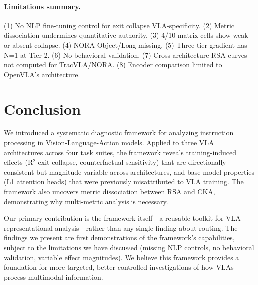 \documentclass[letterpaper]{article}
\begin{document}
\paragraph{Limitations summary.}
(1) No NLP fine-tuning control for exit collapse VLA-specificity.
(2) Metric dissociation undermines quantitative authority.
(3) 4/10 matrix cells show weak or absent collapse.
(4) NORA Object/Long missing.
(5) Three-tier gradient has N=1 at Tier-2.
(6) No behavioral validation.
(7) Cross-architecture RSA curves not computed for TracVLA/NORA.
(8) Encoder comparison limited to OpenVLA's architecture.

\section{Conclusion}

We introduced a systematic diagnostic framework for analyzing instruction processing in Vision-Language-Action models.
Applied to three VLA architectures across four task suites, the framework reveals training-induced effects (R$^2$ exit collapse, counterfactual sensitivity) that are directionally consistent but magnitude-variable across architectures, and base-model properties (L1 attention heads) that were previously misattributed to VLA training.
The framework also uncovers metric dissociation between RSA and CKA, demonstrating why multi-metric analysis is necessary.

Our primary contribution is the framework itself---a reusable toolkit for VLA representational analysis---rather than any single finding about routing.
The findings we present are first demonstrations of the framework's capabilities, subject to the limitations we have discussed (missing NLP controls, no behavioral validation, variable effect magnitudes).
We believe this framework provides a foundation for more targeted, better-controlled investigations of how VLAs process multimodal information.



\end{document}
